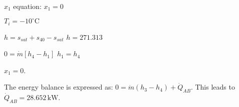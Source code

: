\( x_1 \) equation:  
\( x_1 = 0 \)  

\( T_i = -10^\circ \text{C} \)  

\( h = s_{sat} + s_{40} - s_{sat} \)  
\( h = 271.313 \)  

\( 0 = \dot{m} [h_4 - h_1] \)  
\( h_1 = h_4 \)  

\( x_1 = 0 \).

The energy balance is expressed as:  
\( 0 = \dot{m} (h_3 - h_4) + \dot{Q}_{AB} \).  
This leads to \( \dot{Q}_{AB} = 28.652 \, \text{kW} \).